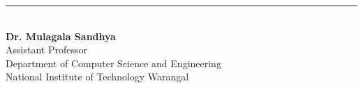 \documentclass[a4paper,12pt,oneside]{book}
\begin{document}
\vspace{3cm}

\begin{flushleft}
\rule{7cm}{0.4pt}\\
{\bfseries Dr. Mulagala Sandhya}\\
Assistant Professor\\
Department of Computer Science and Engineering\\
National Institute of Technology Warangal
\end{flushleft}





\tableofcontents
\listoffigures
\listoftables


\clearpage
\hypersetup{pageanchor=true}
\mainmatter
{}
\setcounter{page}{1}








\appendix




\end{document}
